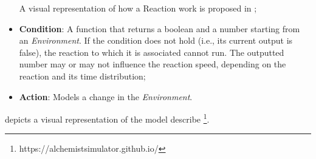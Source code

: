 \begin{itemize}
\begin{itemize}
	\end{itemize}
	A visual representation of how a Reaction work is proposed in ;
	\item \textbf{Condition}: A function that returns a boolean and a number starting from an \textit{Environment}. If the condition does not hold (i.e., its current output is false), the reaction to which it is associated cannot run.
	The outputted number may or may not influence the reaction speed, depending on the reaction and its time distribution;
	\item \textbf{Action}: Models a change in the \textit{Environment}.
\end{itemize}
 depicts a visual representation of the model describe  \footnote{https://alchemistsimulator.github.io/}.


